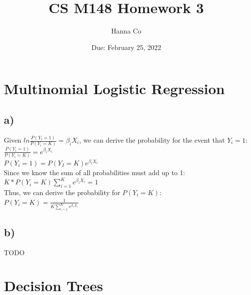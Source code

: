 \documentclass[12pt, letterpaper]{article}
\title{CS M148 Homework 3}
\author{Hanna Co}
\date{Due: February 25, 2022}
\begin{document}
\maketitle
\newpage
\section{Multinomial Logistic Regression}
\subsection*{a)} Given $ln\frac{P(Y_i=1)}{P(Y_i=K)} = \beta_iX_i$, we can derive the probability for the event that $Y_i=1$:\\
$\frac{P(Y_i=1)}{P(Y_i=K)}=e^{\beta_iX_i}$\\
$P(Y_i=1)=P(Y_I=K)e^{\beta_iX_i}$\\
Since we know the sum of all probabilities must add up to 1:\\
$K*P(Y_i=K)\sum_{i=1}^{K}e^{\beta_iX_i}=1$\\
Thus, we can derive the probability for $P(Y_i=K)$:\\
$P(Y_i=K)=\frac{1}{K\sum_{i=1}^{K}e^{\beta_iX_i}}$

\subsection*{b)} TODO

\newpage
\section{Decision Trees}
\end{document}
